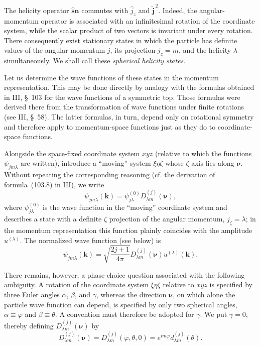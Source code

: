 The helicity operator $\widehat{\mathbf s}\mathbf n$ commutes with $\widehat j_z$ and $\widehat{\mathbf j}^{\,2}$. Indeed, the angular-momentum operator is associated with an infinitesimal rotation of the coordinate system, while the scalar product of two vectors is invariant under every rotation. There consequently exist stationary states in which the particle has definite values of the angular momentum $j$, its projection $j_z=m$, and the helicity $\lambda$ simultaneously. We shall call these \emph{spherical helicity states}.

Let us determine the wave functions of these states in the momentum representation. This may be done directly by analogy with the formulas obtained in III, \S~103 for the wave functions of a symmetric top. Those formulas were derived there from the transformation of wave functions under finite rotations (see III, \S~58). The latter formulas, in turn, depend only on rotational symmetry and therefore apply to momentum-space functions just as they do to coordinate-space functions.

Alongside the space-fixed coordinate system $xyz$ (relative to which the functions $\psi_{jm\lambda}$ are written), introduce a ``moving'' system $\xi\eta\zeta$ whose $\zeta$ axis lies along $\boldsymbol\nu$. Without repeating the corresponding reasoning (cf. the derivation of formula~(103.8) in III), we write
\[
\psi_{jm\lambda}(\mathbf k)
=\psi^{(0)}_{j\lambda}D^{(j)}_{\lambda m}(\boldsymbol\nu),
\]
where $\psi^{(0)}_{j\lambda}$ is the wave function in the ``moving'' coordinate system and describes a state with a definite $\zeta$ projection of the angular momentum, $j_\zeta=\lambda$; in the momentum representation this function plainly coincides with the amplitude $u^{(\lambda)}$. The normalized wave function (see below) is
\begin{equation}
\psi_{jm\lambda}(\mathbf k)
=\sqrt{\frac{2j+1}{4\pi}}D^{(j)}_{\lambda m}(\boldsymbol\nu)
u^{(\lambda)}(\mathbf k).
\tag{16.4}
\end{equation}

There remains, however, a phase-choice question associated with the following ambiguity. A rotation of the coordinate system $\xi\eta\zeta$ relative to $xyz$ is specified by three Euler angles $\alpha$, $\beta$, and $\gamma$, whereas the direction $\boldsymbol\nu$, on which alone the particle wave function can depend, is specified by only two spherical angles, $\alpha\equiv\varphi$ and $\beta\equiv\theta$. A convention must therefore be adopted for $\gamma$. We put $\gamma=0$, thereby defining $D^{(j)}_{\lambda m}(\boldsymbol\nu)$ by
\begin{equation}
D^{(j)}_{\lambda m}(\boldsymbol\nu)
=D^{(j)}_{\lambda m}(\varphi,\theta,0)
=e^{im\varphi}d^{(j)}_{\lambda m}(\theta).
\tag{16.5}
\end{equation}

